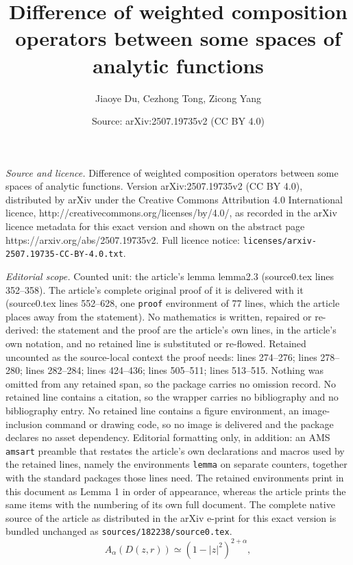 \documentclass[10pt,a4paper]{amsart}
\title{Difference of weighted composition operators between some spaces of analytic functions}
\author{Jiaoye Du, Cezhong Tong, Zicong Yang}
\date{Source: arXiv:2507.19735v2 (CC BY 4.0)}
\begin{document}
\maketitle

\noindent\emph{Source and licence.} Difference of weighted composition operators between some spaces of analytic functions. Version arXiv:2507.19735v2 (CC BY 4.0), distributed by arXiv under the Creative Commons Attribution 4.0 International licence, http://creativecommons.org/licenses/by/4.0/, as recorded in the arXiv licence metadata for this exact version and shown on the abstract page https://arxiv.org/abs/2507.19735v2. Full licence notice: \texttt{licenses/arxiv-2507.19735-CC-BY-4.0.txt}.\par\smallskip

\noindent\textit{Editorial scope.} Counted unit: the article's lemma lemma2.3 (source0.tex lines 352--358). The article's complete original proof of it is delivered with it (source0.tex lines 552--628, one \texttt{proof} environment of 77 lines, which the article places away from the statement). No mathematics is written, repaired or re-derived: the statement and the proof are the article's own lines, in the article's own notation, and no retained line is substituted or re-flowed.  Retained uncounted as the source-local context the proof needs: lines 274--276; lines 278--280; lines 282--284; lines 424--436; lines 505--511; lines 513--515.  Nothing was omitted from any retained span, so the package carries no omission record.  No retained line contains a citation, so the wrapper carries no bibliography and no bibliography entry.  No retained line contains a figure environment, an image-inclusion command or drawing code, so no image is delivered and the package declares no asset dependency.  Editorial formatting only, in addition: an AMS \texttt{amsart} preamble that restates the article's own declarations and macros used by the retained lines, namely the environments \texttt{lemma} on separate counters, together with the standard packages those lines need.  The retained environments print in this document as Lemma 1 in order of appearance, whereas the article prints the same items with the numbering of its own full document.  The complete native source of the article as distributed in the arXiv e-print for this exact version is bundled unchanged as \texttt{sources/182238/source0.tex}.
\begin{equation}\label{equa2.2}
A_{\alpha}(D(z,r))\simeq (1-|z|^2)^{2+\alpha},
\end{equation}
\end{document}
